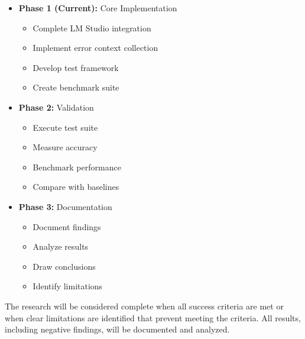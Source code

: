 \begin{itemize}
    \item \textbf{Phase 1 (Current):} Core Implementation
    \begin{itemize}
        \item Complete LM Studio integration
        \item Implement error context collection
        \item Develop test framework
        \item Create benchmark suite
    \end{itemize}
    \item \textbf{Phase 2:} Validation
    \begin{itemize}
        \item Execute test suite
        \item Measure accuracy
        \item Benchmark performance
        \item Compare with baselines
    \end{itemize}
    \item \textbf{Phase 3:} Documentation
    \begin{itemize}
        \item Document findings
        \item Analyze results
        \item Draw conclusions
        \item Identify limitations
    \end{itemize}
\end{itemize}

The research will be considered complete when all success criteria are met or when clear limitations are identified that prevent meeting the criteria. All results, including negative findings, will be documented and analyzed.